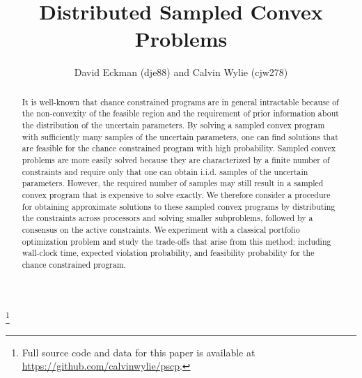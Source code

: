 \documentclass[12pt]{article}
\title{Distributed Sampled Convex Problems}
\author{David Eckman (dje88) and Calvin Wylie (cjw278)}
\date{}
\newcommand\blfootnote[1]{%
  \begingroup
  \renewcommand\thefootnote{}\footnote{#1}%
  \addtocounter{footnote}{-1}%
  \endgroup
}
\begin{document}
\setlength{\parindent}{24pt}

\maketitle

\begin{abstract}
It is well-known that chance constrained programs are in general intractable because of the non-convexity of the feasible region and the requirement of prior information about the distribution of the uncertain parameters.
By solving a sampled convex program with sufficiently many samples of the uncertain parameters, one can find solutions that are feasible for the chance constrained program with high probability.
Sampled convex problems are more easily solved because they are characterized by a finite number of constraints and require only that one can obtain i.i.d. samples of the uncertain parameters.
However, the required number of samples may still result in a sampled convex program that is expensive to solve exactly.
We therefore consider a procedure for obtaining approximate solutions to these sampled convex programs by distributing the constraints across processors and solving smaller subproblems, followed by a consensus on the active constraints.
We experiment with a classical portfolio optimization problem and study the trade-offs that arise from this method: including wall-clock time, expected violation probability, and feasibility probability for the chance constrained program.
\end{abstract}

\blfootnote{Full source code and data for this paper is available at \url{https://github.com/calvinwylie/pscp}.}
\end{document}
